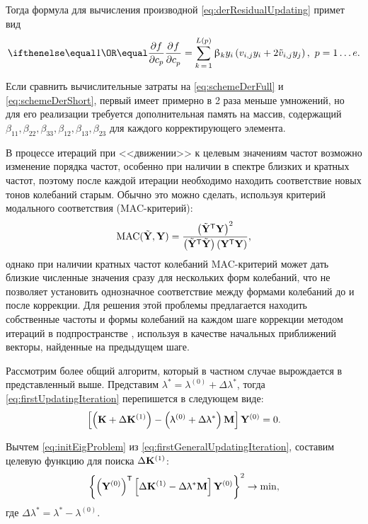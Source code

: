 Тогда формула для вычисления производной \eqref{eq:derResidualUpdating} примет вид
\begin{equation}
	\partDer{f}{c_p}{} = \sum\limits_{k\,=\,1} ^ {L(p)} \beta_k y_i \rbrackets{v_{i, j} y_i + 2 \tilde{v}_{i, j} y_j}, \ p = 1 \hdots e.
	\label{eq:schemeDerShort}
\end{equation}

Если сравнить вычислительные затраты на \eqref{eq:schemeDerFull} и \eqref{eq:schemeDerShort}, первый имеет примерно в 2 раза меньше умножений, но для его реализации требуется дополнительная память на массив, содержащий $ \beta_{11}, \beta_{22}, \beta_{33}, \beta_{12}, \beta_{13}, \beta_{23} $ для каждого корректирующего элемента. 

В процессе итераций при <<движении>> к целевым значениям частот возможно изменение порядка частот, особенно при наличии в спектре близких и кратных частот, поэтому после каждой итерации необходимо находить соответствие новых тонов колебаний старым. Обычно это можно сделать, используя критерий модального соответствия (MAC-критерий):
\begin{equation}
	\text{MAC}(\tilde{\mathbf{Y}}, \mathbf{Y}) = \frac{\left( \tilde{\mathbf{Y}} ^ \mathsf{T} \mathbf{Y} \right) ^ 2}{\left( \tilde{\mathbf{Y}} ^ \mathsf{T} \tilde{\mathbf{Y}} \right) \left( \mathbf{Y} ^ \mathsf{T} \mathbf{Y} \right)},
	\label{eq:MAC}
\end{equation}
однако при наличии кратных частот колебаний MAC-критерий может дать близкие численные значения сразу для нескольких форм колебаний, что не позволяет установить однозначное соответствие между формами колебаний до и после коррекции. Для решения этой проблемы предлагается находить собственные частоты и формы колебаний на каждом шаге коррекции методом итераций в подпространстве \cite{lib:modelUpdating:Bathe}, используя в качестве начальных приближений векторы, найденные на предыдущем шаге.

Рассмотрим более общий алгоритм, который в частном случае вырождается в представленный выше. Представим $ \lambda ^ \ast = \lambda ^ {(0)} + \Delta \lambda ^ \ast $, тогда \eqref{eq:firstUpdatingIteration} перепишется в следующем виде:
\begin{equation}
	\left[ \left( \mathbf{K} + \Delta \mathbf{K} ^ {(1)} \right) - \left( \uplambda ^ {(0)} + \Delta \uplambda ^ \ast \right) \mathbf{M} \right] \mathbf{Y} ^ {(0)} = 0.
	\label{eq:firstGeneralUpdatingIteration}
\end{equation}

Вычтем \eqref{eq:initEigProblem} из \eqref{eq:firstGeneralUpdatingIteration}, составим целевую функцию для поиска $ \Delta \mathbf{K} ^ {(1)} $:
\begin{equation}
	\left\{ \left( \mathbf{Y}^ {(0)} \right) ^ \mathsf{T} \left[  \Delta \mathbf{K} ^ {(1)} - \Delta \uplambda ^ {\ast} \mathbf{M} \right] \mathbf{Y} ^ {(0)}  \right\} ^ 2 \rightarrow \min,
	\label{eq:objFunGeneralUpdating}
\end{equation}
где $ \Delta \lambda ^ \ast = \lambda ^ \ast - \lambda ^ {(0)}$.

